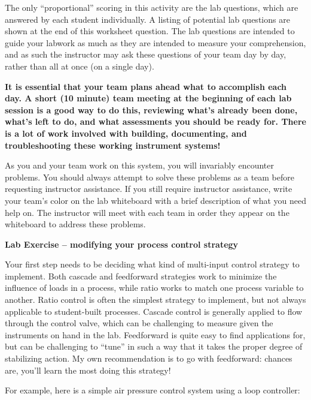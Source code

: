 The only ``proportional'' scoring in this activity are the lab questions, which are answered by each student individually.  A listing of potential lab questions are shown at the end of this worksheet question.  The lab questions are intended to guide your labwork as much as they are intended to measure your comprehension, and as such the instructor may ask these questions of your team day by day, rather than all at once (on a single day).

\vskip 10pt

{\bf It is essential that your team plans ahead what to accomplish each day.  A short (10 minute) team meeting at the beginning of each lab session is a good way to do this, reviewing what's already been done, what's left to do, and what assessments you should be ready for.  There is a lot of work involved with building, documenting, and troubleshooting these working instrument systems!}

As you and your team work on this system, you will invariably encounter problems.  You should always attempt to solve these problems as a team before requesting instructor assistance.  If you still require instructor assistance, write your team's color on the lab whiteboard with a brief description of what you need help on.  The instructor will meet with each team in order they appear on the whiteboard to address these problems.






\vfil \eject

\noindent
{\bf Lab Exercise -- modifying your process control strategy}

\vskip 5pt

Your first step needs to be deciding what kind of multi-input control strategy to implement.  Both cascade and feedforward strategies work to minimize the influence of loads in a process, while ratio works to match one process variable to another.  Ratio control is often the simplest strategy to implement, but not always applicable to student-built processes.  Cascade control is generally applied to flow through the control valve, which can be challenging to measure given the instruments on hand in the lab.  Feedforward is quite easy to find applications for, but can be challenging to ``tune'' in such a way that it takes the proper degree of stabilizing action.  My own recommendation is to go with feedforward: chances are, you'll learn the most doing this strategy!

For example, here is a simple air pressure control system using a loop controller:

